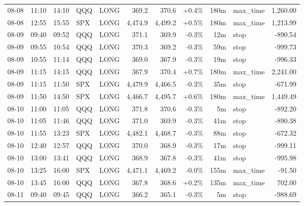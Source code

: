 \documentclass[11pt,a4paper,twoside]{article}
\begin{document}
\begin{center}
\begin{longtable}{>{\color{txtmain}}l l l l l r r r r >{\color{txtmain}}l r}
08-08 & 11:10 & 14:10 & QQQ & LONG & 369.2 & 370.6 & \textcolor{wingreen}{+0.4\%} & 180m & max\_time & \textcolor{wingreen}{1,260.00} \\
08-08 & 12:55 & 15:55 & SPX & LONG & 4,474.9 & 4,499.2 & \textcolor{wingreen}{+0.5\%} & 180m & max\_time & \textcolor{wingreen}{1,213.99} \\
08-09 & 09:40 & 09:52 & QQQ & LONG & 371.1 & 369.9 & \textcolor{lossred}{-0.3\%} & 12m & stop & \textcolor{lossred}{-890.54} \\
08-09 & 09:55 & 10:54 & QQQ & LONG & 370.3 & 369.2 & \textcolor{lossred}{-0.3\%} & 59m & stop & \textcolor{lossred}{-999.73} \\
08-09 & 10:55 & 11:14 & QQQ & LONG & 369.0 & 367.9 & \textcolor{lossred}{-0.3\%} & 19m & stop & \textcolor{lossred}{-996.33} \\
08-09 & 11:15 & 14:15 & QQQ & LONG & 367.9 & 370.4 & \textcolor{wingreen}{+0.7\%} & 180m & max\_time & \textcolor{wingreen}{2,241.00} \\
08-09 & 11:15 & 11:50 & SPX & LONG & 4,479.9 & 4,466.5 & \textcolor{lossred}{-0.3\%} & 35m & stop & \textcolor{lossred}{-671.99} \\
08-09 & 11:50 & 14:50 & SPX & LONG & 4,466.7 & 4,495.7 & \textcolor{wingreen}{+0.6\%} & 180m & max\_time & \textcolor{wingreen}{1,449.49} \\
08-10 & 11:00 & 11:05 & QQQ & LONG & 371.8 & 370.6 & \textcolor{lossred}{-0.3\%} & 5m & stop & \textcolor{lossred}{-892.20} \\
08-10 & 11:05 & 11:46 & QQQ & LONG & 371.0 & 369.9 & \textcolor{lossred}{-0.3\%} & 41m & stop & \textcolor{lossred}{-890.38} \\
08-10 & 11:55 & 13:23 & SPX & LONG & 4,482.1 & 4,468.7 & \textcolor{lossred}{-0.3\%} & 88m & stop & \textcolor{lossred}{-672.32} \\
08-10 & 12:40 & 12:57 & QQQ & LONG & 370.0 & 368.9 & \textcolor{lossred}{-0.3\%} & 17m & stop & \textcolor{lossred}{-999.11} \\
08-10 & 13:00 & 13:41 & QQQ & LONG & 368.9 & 367.8 & \textcolor{lossred}{-0.3\%} & 41m & stop & \textcolor{lossred}{-995.98} \\
08-10 & 13:25 & 16:00 & SPX & LONG & 4,471.1 & 4,469.2 & \textcolor{lossred}{-0.0\%} & 155m & max\_time & \textcolor{lossred}{-91.50} \\
08-10 & 13:45 & 16:00 & QQQ & LONG & 367.8 & 368.6 & \textcolor{wingreen}{+0.2\%} & 135m & max\_time & \textcolor{wingreen}{702.00} \\
08-11 & 09:40 & 09:45 & QQQ & LONG & 366.2 & 365.1 & \textcolor{lossred}{-0.3\%} & 5m & stop & \textcolor{lossred}{-988.69} \\

\end{longtable}
\end{center}
\end{document}
